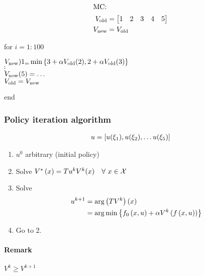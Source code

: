 \begin{align*}
\intertext{MC:}
{V}_{\textnormal{old}} &= \begin{bmatrix}1 & 2 & 3 & 4 & 5\end{bmatrix}\\
{V}_{\textnormal{new}} &= {V}_{\textnormal{old}}
\end{align*}
\begin{addmargin}[3em]{3em}
for $i = 1:100$
    \begin{addmargin}[3em]{3em}
    ${V}_{\textnormal{new}})1_ = \min \left\lbrace 3 + \alpha {V}_{\textnormal{old}}(2), 2 + \alpha {V}_{\textnormal{old}}(3) \right\rbrace$\\
    $\vdots$\\
    ${V}_{\textnormal{now}}(5) = \dots$\\
    ${V}_{\textnormal{old}} = {V}_{\textnormal{new}}$
    \end{addmargin}
end
\end{addmargin}

\subsubsection{Policy iteration algorithm}
\begin{align*}
u = \left[ u(\xi_1), u(\xi_2), \dots u(\xi_5) \right]
\end{align*}
\begin{enumerate}
\item $u^0$ arbitrary (initial policy)
\item Solve $V^* \paren{x} = Tu^k V^k(x)    \quad \forall ~x \in \setX{}$
\item Solve
    \begin{align*}
        u^{k+1} &= \arg \left( TV^k \right)\left( x \right) \\
                &= \operatorname*{arg\,min} \left\lbrace f_0 \left( x,u \right) + \alpha V^k\left( f \left( x,u \right) \right) \right\rbrace
    \end{align*}
\item Go to 2.
\end{enumerate}
\paragraph{Remark} $V^k \geq V^{k+1}$


